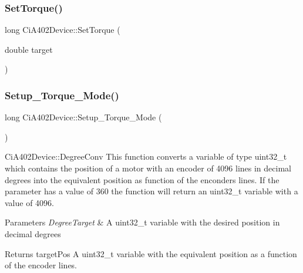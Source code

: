 \subsubsection{\texorpdfstring{Set\+Torque()}{SetTorque()}}
{\footnotesize\ttfamily long Ci\+A402\+Device\+::\+Set\+Torque (\begin{DoxyParamCaption}\item[{double}]{target }\end{DoxyParamCaption})}

\mbox{\label{classCiA402Device_a20475438205c26cd4bcc689ed9c7fe95}} 
\subsubsection{\texorpdfstring{Setup\+\_\+\+Torque\+\_\+\+Mode()}{Setup\_Torque\_Mode()}}
{\footnotesize\ttfamily long Ci\+A402\+Device\+::\+Setup\+\_\+\+Torque\+\_\+\+Mode (\begin{DoxyParamCaption}{ }\end{DoxyParamCaption})}



Ci\+A402\+Device\+::\+Degree\+Conv This function converts a variable of type uint32\+\_\+t which contains the position of a motor with an encoder of 4096 lines in decimal degrees into the equivalent position as function of the enconders lines. If the parameter has a value of 360 the function will return an uint32\+\_\+t variable with a value of 4096. 


\begin{DoxyParams}{Parameters}
{\em Degree\+Target} & A uint32\+\_\+t variable with the desired position in decimal degrees \\
\hline
\end{DoxyParams}
\begin{DoxyReturn}{Returns}
target\+Pos A uint32\+\_\+t variable with the equivalent position as a function of the encoder lines. 
\end{DoxyReturn}
\mbox{\label{classCiA402Device_ac1db22a6a8a7d7a56590423bd7577c7b}} 
